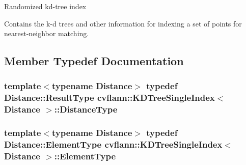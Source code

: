 Randomized kd-\/tree index

Contains the k-\/d trees and other information for indexing a set of points for nearest-\/neighbor matching. 

\subsection{Member Typedef Documentation}
\hypertarget{classcvflann_1_1KDTreeSingleIndex_ab32f2e8496ef780c2538576b8a330029}{
\subsubsection[{Distance\-Type}]{\setlength{\rightskip}{0pt plus 5cm}template$<$typename Distance$>$ typedef Distance\-::\-Result\-Type {\bf cvflann\-::\-K\-D\-Tree\-Single\-Index}$<$ Distance $>$\-::{\bf Distance\-Type}}}\label{classcvflann_1_1KDTreeSingleIndex_ab32f2e8496ef780c2538576b8a330029}
\hypertarget{classcvflann_1_1KDTreeSingleIndex_a3b7bf5e05057a76d1b7eee693062784e}{
\subsubsection[{Element\-Type}]{\setlength{\rightskip}{0pt plus 5cm}template$<$typename Distance$>$ typedef Distance\-::\-Element\-Type {\bf cvflann\-::\-K\-D\-Tree\-Single\-Index}$<$ Distance $>$\-::{\bf Element\-Type}}}\label{classcvflann_1_1KDTreeSingleIndex_a3b7bf5e05057a76d1b7eee693062784e}


